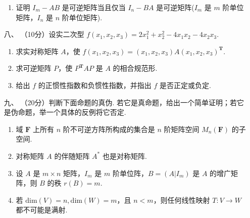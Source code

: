 \begin{enumerate}
\begin{enumerate}[label=(\arabic*)]
        \item 证明 $I_m-AB$ 是可逆矩阵当且仅当 $I_n-BA$ 是可逆矩阵($I_m$ 是 $m$ 阶单位矩阵，$I_n$ 是 $n$ 阶单位矩阵).
    \end{enumerate}

\item [八、]（10分）设实二次型 $f(x_1,x_2,x_3) = 2x_1^2+x_2^2-4x_1x_2-4x_2x_3$.
    \begin{enumerate}[label=(\arabic*)]
        \item 求实对称矩阵 $A$，使 $f(x_1,x_2,x_3)=(x_1,x_2,x_3)A(x_1,x_2,x_3)^{\mathbf{T}}$.

        \item 求可逆矩阵 $P$，使 $P^\mathbf{T}AP$ 是 $A$ 的相合规范形.

        \item 给出 $f$ 的正惯性指数和负惯性指数，并指出 $f$ 是否正定或负定.
    \end{enumerate}

\item [九、]（20分）判断下面命题的真伪. 若它是真命题，给出一个简单证明；若它是伪命题，举一个具体的反例将它否定.
    \begin{enumerate}[label=(\arabic*)]
        \item 域 $\mathbf{F}$ 上所有 $n$ 阶不可逆方阵所构成的集合是 $n$ 阶矩阵空间 $M_n(\mathbf{F})$ 的子空间.

        \item 对称矩阵 $A$ 的伴随矩阵 $A^*$ 也是对称矩阵.

        \item 设 $A$ 是 $m\times n$ 矩阵，$I_m$ 是 $m$ 阶单位阵，$B=(A|I_m)$ 是 $A$ 的增广矩阵，则 $B$ 的秩 $r(B)=m$.

        \item 若 $\mathrm{dim}(V) = n,\mathrm{dim}(W) = m$，且 $n < m$，则任何线性映射 $T:V\to W$ 都不可能是满射.
    \end{enumerate}
\end{enumerate}

\clearpage
